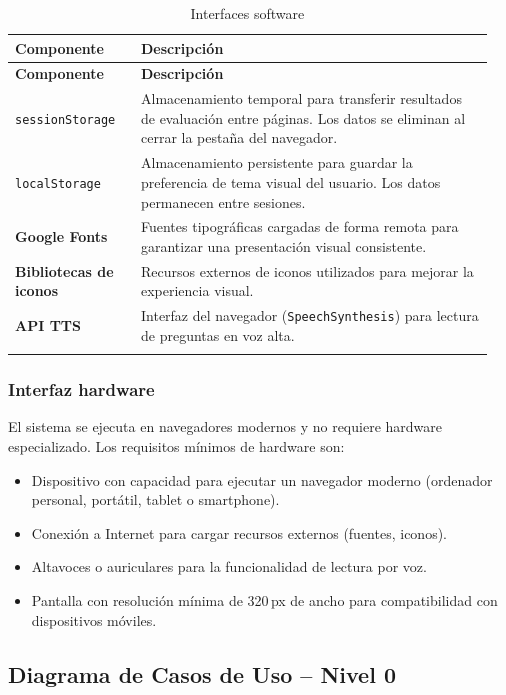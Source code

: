 \begin{longtable}{p{0.25\linewidth} p{0.70\linewidth}}
\toprule
\rowcolor{tableheader!20}
\textbf{Componente} & \textbf{Descripción} \\
\midrule
\endfirsthead
\rowcolor{tableheader!20}
\textbf{Componente} & \textbf{Descripción} \\
\midrule
\endhead
\bottomrule
\endfoot
\texttt{sessionStorage} & Almacenamiento temporal para transferir resultados de evaluación entre páginas. Los datos se eliminan al cerrar la pestaña del navegador. \\
\texttt{localStorage}   & Almacenamiento persistente para guardar la preferencia de tema visual del usuario. Los datos permanecen entre sesiones. \\
\textbf{Google Fonts}   & Fuentes tipográficas cargadas de forma remota para garantizar una presentación visual consistente. \\
\textbf{Bibliotecas de iconos} & Recursos externos de iconos utilizados para mejorar la experiencia visual. \\
\textbf{API TTS}        & Interfaz del navegador (\texttt{SpeechSynthesis}) para lectura de preguntas en voz alta. \\
\bottomrule
\caption{Interfaces software}
\label{tab:interfaces_sw}
\end{longtable}

\subsubsection{Interfaz hardware}
\label{sec:interfaz_hardware}

El sistema se ejecuta en navegadores modernos y no requiere hardware especializado. Los requisitos mínimos de hardware son:

\begin{itemize}
  \item Dispositivo con capacidad para ejecutar un navegador moderno (ordenador personal, portátil, tablet o smartphone).
  \item Conexión a Internet para cargar recursos externos (fuentes, iconos).
  \item Altavoces o auriculares para la funcionalidad de lectura por voz.
  \item Pantalla con resolución mínima de 320\,px de ancho para compatibilidad con dispositivos móviles.
\end{itemize}

\subsection{Diagrama de Casos de Uso – Nivel 0}
\label{sec:dcu_nivel0}

